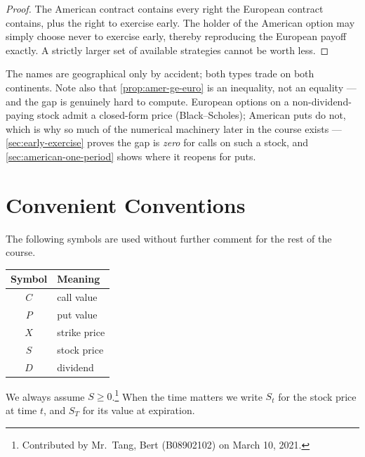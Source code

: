 \suppstart
\begin{proof}
	The American contract contains every right the European contract contains, plus the right to exercise early.
	The holder of the American option may simply choose never to exercise early, thereby reproducing the European payoff exactly.
	A strictly larger set of available strategies cannot be worth less.
\end{proof}

\begin{note}
	The names are geographical only by accident; both types trade on both continents.
	Note also that \autoref{prop:amer-ge-euro} is an inequality, not an equality --- and the gap is genuinely hard to compute.
	European options on a non-dividend-paying stock admit a closed-form price (Black--Scholes); American puts do not, which is why so much of the numerical machinery later in the course exists --- \autoref{sec:early-exercise} proves the gap is \emph{zero} for calls on such a stock, and \autoref{sec:american-one-period} shows where it reopens for puts.
\end{note}
\suppend

\section{Convenient Conventions}


\begin{notation}
	The following symbols are used without further comment for the rest of the course.
	\begin{center}
		\begin{tabular}{@{}cl@{}}
			\toprule
			Symbol & Meaning              \\
			\midrule
			$C$    & call value           \\
			$P$    & put value            \\
			$X$    & strike price         \\
			$S$    & stock price          \\
			$D$    & dividend             \\
			\bottomrule
		\end{tabular}
	\end{center}
	We always assume $S\ge 0$.\footnote{Contributed by Mr.~Tang, Bert (B08902102) on March 10, 2021.}
	When the time matters we write $S_{t}$ for the stock price at time $t$, and $S_{T}$ for its value at expiration.
\end{notation}

